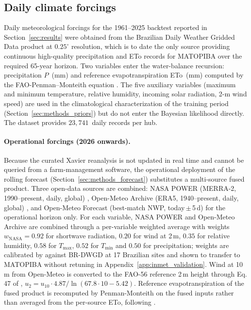 \documentclass[review,5p,times]{elsarticle}
\begin{document}
\subsection{Daily climate forcings}\label{sec:methods_data}

Daily meteorological forcings for the 1961--2025 backtest reported in
Section~\ref{sec:results} were obtained from the Brazilian Daily
Weather Gridded Data product \cite{Xavier2022} at $0.25^{\circ}$
resolution, which is to date the only source providing continuous
high-quality precipitation and ETo records for MATOPIBA over the
required 65-year horizon. Two variables enter the water-balance
recursion: precipitation $P$~(mm) and reference evapotranspiration
ETo~(mm) computed by the FAO-Penman--Monteith equation
\cite{Allen1998}. The five auxiliary variables (maximum and minimum
temperature, relative humidity, incoming solar radiation, 2-m wind
speed) are used in the climatological characterization of the
training period (Section~\ref{sec:methods_priors}) but do not enter
the Bayesian likelihood directly. The dataset provides
$23{,}741$~daily records per hub.

\paragraph{Operational forcings (2026 onwards).}
Because the curated Xavier reanalysis is not updated in real time and
cannot be queried from a farm-management software, the operational
deployment of the rolling forecast (Section~\ref{sec:methods_forecast})
substitutes a multi-source fused product. Three open-data sources are
combined: NASA POWER (MERRA-2, 1990--present, daily, global)
\cite{NASAPower2024}, Open-Meteo Archive (ERA5, 1940--present, daily,
global) \cite{OpenMeteo2024}, and Open-Meteo Forecast (best-match NWP,
today\,$\pm$\,5\,d) for the operational horizon only. For each variable,
NASA POWER and Open-Meteo Archive are combined through a per-variable
weighted average with weights $w_\mathrm{NASA} = 0.92$ for shortwave
radiation, $0.20$ for wind at 2\,m, $0.35$ for relative humidity,
$0.58$ for $T_\mathrm{max}$, $0.52$ for $T_\mathrm{min}$ and $0.50$
for precipitation; weights are calibrated by \citet{Ribeiro2024}
against BR-DWGD at 17 Brazilian sites and shown to transfer to
MATOPIBA without retuning in Appendix~\ref{app:inmet_validation}.
Wind at 10\,m from Open-Meteo is converted to the FAO-56 reference 2\,m
height through Eq.\,47 of \citet{Allen1998}, $u_2 = u_{10}\cdot
4.87/\ln(67.8\cdot 10 - 5.42)$. Reference evapotranspiration of the
fused product is recomputed by Penman-Monteith on the fused inputs
rather than averaged from the per-source ETo, following
\citet{Ribeiro2024}.
\end{document}
